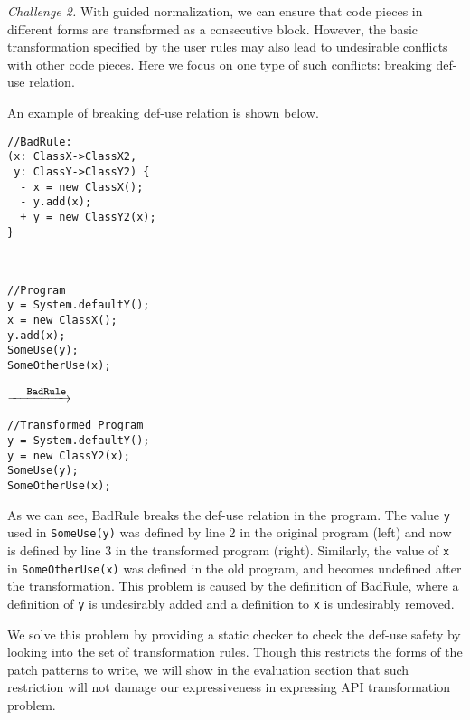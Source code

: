 \documentclass[letterpaper, USenglish]{lipics-v2016}
\newenvironment{smpage}[1]
{\begin{lrbox}{\fmbox}\begin{minipage}{#1}}
{\end{minipage}\end{lrbox}\usebox{\fmbox}}
\newcommand{\code}[1]{\texttt{\footnotesize #1}}
\theoremstyle{plain}
\begin{document}
\textit{Challenge 2.} With guided normalization, we can ensure that code pieces in different
forms are transformed as a consecutive block. However, the basic
transformation specified by the user rules may also lead to undesirable conflicts
with other code pieces. Here we focus
on one type of such conflicts: breaking def-use relation.

An example of breaking def-use relation is shown below.
\begin{center}
\begin{smpage}{0.3\columnwidth}
\begin{lstlisting}[style=patl,frame=none, basicstyle=\scriptsize\ttfamily]
//BadRule:
(x: ClassX->ClassX2, 
 y: ClassY->ClassY2) {
  - x = new ClassX();
  - y.add(x);
  + y = new ClassY2(x);  
}
\end{lstlisting}
\end{smpage}
~
\begin{smpage}{0.25\columnwidth}
\begin{lstlisting}[style=patl,frame=none, basicstyle=\scriptsize\ttfamily]
//Program
y = System.defaultY();
x = new ClassX();
y.add(x);
SomeUse(y);
SomeOtherUse(x);
\end{lstlisting}
\end{smpage}
$\xrightarrow{\code{BadRule}}$~~~
\begin{smpage}{0.25\columnwidth}
\begin{lstlisting}[style=patl,frame=none, basicstyle=\scriptsize\ttfamily]
//Transformed Program
y = System.defaultY();
y = new ClassY2(x);
SomeUse(y);
SomeOtherUse(x);
\end{lstlisting}
\end{smpage}
\end{center}

As we can see, {BadRule} breaks the def-use relation in the program. The
value \code{y} used in \code{SomeUse(y)} was defined by line 2 in the
original program (left) and now is defined by line 3 in the transformed program (right). 
Similarly, the value of \code{x} in \code{SomeOtherUse(x)} was defined in the old program, and becomes
undefined after the transformation. This problem is caused by the
definition of BadRule, where a definition of \code{y} is undesirably
added and a definition to \code{x} is undesirably removed.

We solve this problem by providing a static checker to 
check the def-use safety by looking into the set of transformation
rules. Though this restricts the forms of the patch patterns to write, we will show in the evaluation section that such restriction will not damage our expressiveness in expressing API transformation problem.
\end{document}
